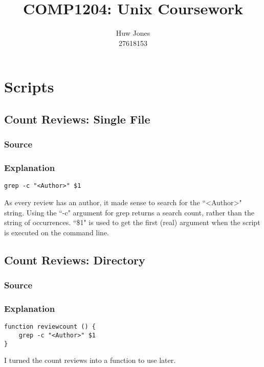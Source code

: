 \documentclass[12pt,a4paper]{article}
\author{Huw Jones \\27618153}
\title{COMP1204: Unix Coursework}
\begin{document}
\maketitle
\newpage

\section{Scripts}

\subsection{Count Reviews: Single File}

\subsubsection{Source}



\subsubsection{Explanation}

\begin{lstlisting}
grep -c "<Author>" $1
\end{lstlisting}
As every review has an author, it made sense to search for the ``\textless Author\textgreater" string.
Using the ``-c" argument for grep returns a search count, rather than the string of occurrences.
``\$1" is used to get the first (real) argument when the script is executed on the command line.


\subsection{Count Reviews: Directory}

\subsubsection{Source}



\subsubsection{Explanation}

\begin{lstlisting}
function reviewcount () {
	grep -c "<Author>" $1
}
\end{lstlisting}
I turned the count reviews into a function to use later.
\end{document}
